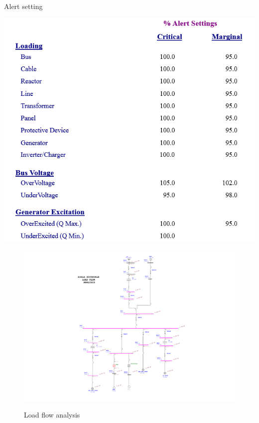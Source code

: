 \begin{table}[]
	\caption{Alert setting}
	\label{tbl_ch04_elecaudit_load_flow_alertsetting01}
	\includegraphics[scale=0.3]{tables/tbl_ch04_elecaudit_load_flow_alertsetting01}
\end{table}


\begin{figure}[]
	\includegraphics[width=\textwidth]{figures/ASV_LF_ANALYSIS.pdf} \\
	\caption{Load flow analysis}
	\label{ASV_LF_ANALYSIS} 
\end{figure}

